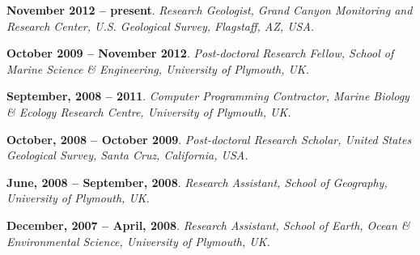 \documentclass[margin,line]{resume}
\begin{document}
\begin{resume}
\begin{footnotesize}
    {\bf November 2012 --  present}. {\sl Research Geologist, Grand Canyon Monitoring and Research Center, U.S. Geological Survey, Flagstaff, AZ, USA.}

    {\bf October 2009 -- November 2012}. {\sl Post-doctoral Research Fellow, School of Marine Science \& Engineering, University of Plymouth, UK.} %

    {\bf September, 2008 -- 2011}. {\sl Computer Programming Contractor, Marine Biology \& Ecology Research Centre, University of Plymouth, UK.} %

    {\bf October, 2008 -- October 2009}. {\sl Post-doctoral Research Scholar, United States Geological Survey, Santa Cruz, California, USA.} %

    {\bf June, 2008 -- September, 2008}. {\sl Research Assistant, School of Geography, University of Plymouth, UK.} %

    {\bf December, 2007 -- April, 2008}. {\sl Research Assistant, School of Earth, Ocean \& Environmental Science, University of Plymouth, UK.} %


\end{footnotesize}
\end{resume}
\end{document}
